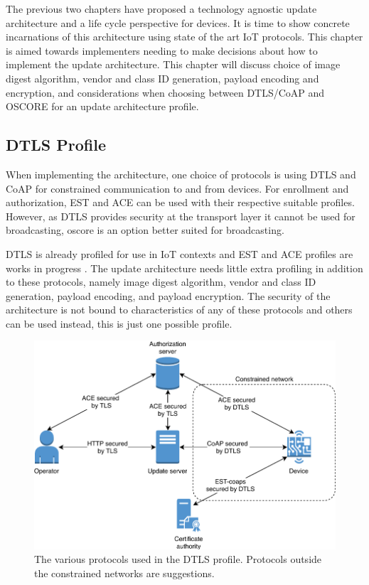 \documentclass[0-thesis.tex]{subfiles}
\begin{document}
\label{chap:profiles}
The previous two chapters have proposed a technology agnostic update architecture and a
life cycle perspective for devices. It is time to show concrete incarnations of this
architecture using state of the art IoT protocols. This chapter is aimed towards
implementers needing to make decisions about how to implement the update architecture.
This chapter will discuss choice of image digest algorithm, vendor and class ID
generation, payload encoding and encryption, and considerations when choosing between
DTLS/CoAP and OSCORE for an update architecture profile.

\subsection{DTLS Profile}
\label{sec:dtls-profile}
When implementing the architecture, one choice of protocols is using DTLS and CoAP for
constrained communication to and from devices. For enrollment and authorization, EST and
ACE can be used with their respective suitable profiles. However, as DTLS provides
security at the transport layer it cannot be used for broadcasting, \gls{oscore} is an
option better suited for broadcasting. 

DTLS is already profiled for use in IoT contexts and EST and ACE profiles are works in
progress \parencite{rfc7925, est-coaps, ace-dtls-profile}. The update architecture needs
little extra profiling in addition to these protocols, namely image digest algorithm,
vendor and class ID generation, payload encoding, and payload encryption. The security of
the architecture is not bound to characteristics of any of these protocols and others can
be used instead, this is just one possible profile.

\begin{figure}
    \caption{The various protocols used in the DTLS profile. Protocols outside the constrained networks are suggestions.}
    \label{fig:dtls-profile}
    \includegraphics{images/dtls-profile.pdf}
\end{figure}
\end{document}
